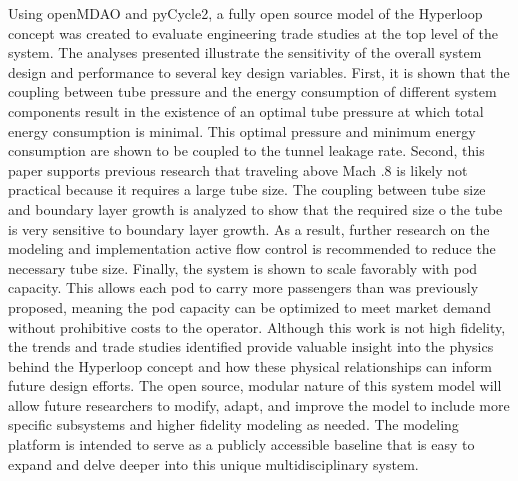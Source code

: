 Using openMDAO and pyCycle2, a fully open source model of the Hyperloop concept was created to evaluate engineering trade studies at the top level of the system. The analyses presented illustrate the sensitivity of the overall system design and performance to several key design variables. First, it is shown that the coupling between tube pressure and the energy consumption of different system components result in the existence of an optimal tube pressure at which total energy consumption is minimal. This optimal pressure and minimum energy consumption are shown to be coupled to the tunnel leakage rate. Second, this paper supports previous research that traveling above Mach .8 is likely not practical because it requires a large tube size. The coupling between tube size and boundary layer growth is analyzed to show that the required size o the tube is very sensitive to boundary layer growth. As a result, further research on the modeling and implementation active flow control is recommended to reduce the necessary tube size. Finally, the system is shown to scale favorably with pod capacity. This allows each pod to carry more passengers than was previously proposed, meaning the pod capacity can be optimized to meet market demand without prohibitive costs to the operator. Although this work is not high fidelity, the trends and trade studies identified provide valuable insight into the physics behind the Hyperloop concept and how these physical relationships can inform future design efforts. The open source, modular nature of this system model will allow future researchers to modify, adapt, and improve the model to include more specific subsystems and higher fidelity modeling as needed. The modeling platform is intended to serve as a publicly accessible baseline that is easy to expand and delve deeper into this unique multidisciplinary system.